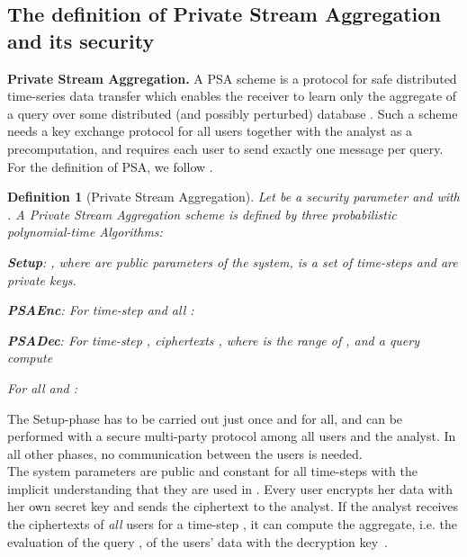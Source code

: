 \documentclass[10pt]{extarticle}
\newtheorem{Def}{Definition}
\begin{document}
\subsection{The definition of Private Stream Aggregation and its security}

\noindent\textbf{Private Stream Aggregation.} A PSA scheme is a protocol for safe distributed time-series data transfer which enables the receiver to learn only the aggregate  of a query  over some distributed (and possibly perturbed) database . Such a scheme needs a key exchange protocol for all  users together with the analyst as a precomputation, and requires each user to send exactly one message per query. For the definition of PSA, we follow \cite{2}.

\begin{Def}[Private Stream Aggregation]
Let  be a security parameter and  with . A Private Stream Aggregation scheme  is defined by three probabilistic polynomial-time Algorithms:
\begin{description}
\item \textbf{\mbox{\upshape \sffamily Setup}}: , where  are public parameters of the system,  is a set of time-steps and  are private keys.
\item \textbf{\mbox{\upshape \sffamily PSAEnc}}: For time-step  and all : 

\item \textbf{\mbox{\upshape \sffamily PSADec}}: For time-step , ciphertexts , where  is the range of , and a query  compute

For all  and :

\end{description}
\end{Def}

The Setup-phase has to be carried out just once and for all, and can be performed with a secure multi-party protocol among all users and the analyst. In all other phases, no communication between the users is needed.\\
The system parameters  are public and constant for all time-steps with the implicit understanding that they are used in . Every user encrypts her data  with her own secret key  and sends the ciphertext to the analyst. If the analyst receives the ciphertexts of \textit{all} users for a time-step , it can compute the aggregate, i.e. the evaluation of the query , of the users' data with the decryption key~.\\
\end{document}
